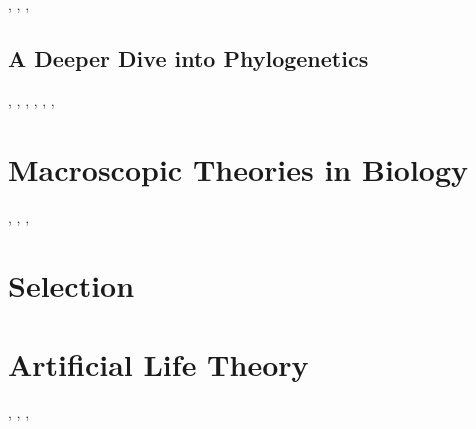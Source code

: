 \documentclass[]{article}
\begin{document}
\cite{hillis1996molecular}, \cite{zuckerkandl1965molecules}, \cite{williams2006assessing}, \cite{woese2002evolution}

\subsection{A Deeper Dive into Phylogenetics}

\cite{huelsenbeck2001mrbayes}, \cite{huelsenbeck1997phylogeny}, \cite{hug2016new}, \cite{philippe2005heterotachy}, \cite{quast2012silva}, \cite{sanderson2003r8s}, \cite{smit2007evolutionary}

\section{Macroscopic Theories in Biology}

\cite{white2005allometric}, \cite{west1997general}, \cite{kempes2011predicting}, \cite{kempes2016evolutionary}
\section{Selection}

\cite{darwin1859origin}

\section{Artificial Life Theory}

\cite{neumann1966theory}, \cite{neumann1958computer}, \cite{janzing2010there}, \cite{schaeffer2014physicallyuniversal}


\printglossaries

 


\end{document}
